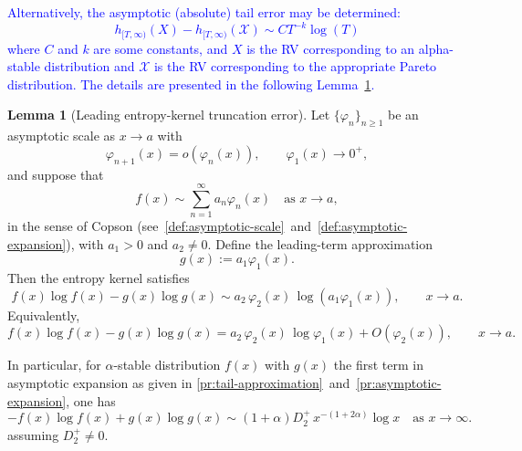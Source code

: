 \documentclass{article}
\theoremstyle{definition}
\newtheorem{lemma}[definition]{Lemma}
\begin{document}
\textcolor{blue}{Alternatively, the asymptotic (absolute) tail error may be determined:
\begin{equation*}
    h_{[T,\infty)}(X)-h_{[T,\infty)}(\mathcal{X})\sim CT^{-k}\log(T)
\end{equation*}
where \(C\) and \(k\) are some constants, and \(X\) is the RV corresponding to an alpha-stable distribution and \(\mathcal{X}\) is the RV corresponding to the appropriate Pareto distribution. The details are presented in the following Lemma~\ref{lem:tail-entropy-trunc-err}.
}

\begin{lemma}[Leading entropy-kernel truncation error]\label{lem:tail-entropy-trunc-err}
Let $\{\varphi_n\}_{n\ge1}$ be an asymptotic scale as $x\to a$ with
\[
\varphi_{n+1}(x)=o(\varphi_n(x)), \qquad \varphi_1(x)\to0^+,
\]
and suppose that
\[
f(x)\sim \sum_{n=1}^\infty a_n\varphi_n(x)
\quad \text{as } x\to a,
\]
in the sense of Copson (see~\ref{def:asymptotic-scale}~and~\ref{def:asymptotic-expansion}), with \(a_1>0\) and \(a_2\neq0\).  
Define the leading-term approximation
\[
g(x):=a_1\varphi_1(x).
\]
Then the entropy kernel satisfies
\[
f(x)\log f(x)-g(x)\log g(x)
\sim
a_2\,\varphi_2(x)\,\log\left(a_1\varphi_1(x)\right),
\qquad x\to a.
\]
Equivalently,
\[
f(x)\log f(x)-g(x)\log g(x)
=
a_2\,\varphi_2(x)\,\log\varphi_1(x)
+
O\!\left(\varphi_2(x)\right),
\qquad x\to a.
\]
\end{lemma}
In particular, for \(\alpha\)-stable distribution \(f(x)\) with \(g(x)\) the first term in asymptotic expansion as given in \ref{pr:tail-approximation}~and~\ref{pr:asymptotic-expansion}, one has
\[
-f(x)\log f(x)+g(x)\log g(x)
\sim
(1+\alpha)D_2^+\,x^{-(1+2\alpha)}\log x \quad \text{as }x\to\infty.
\]
assuming \(D_2^+\neq0\).
\end{document}
